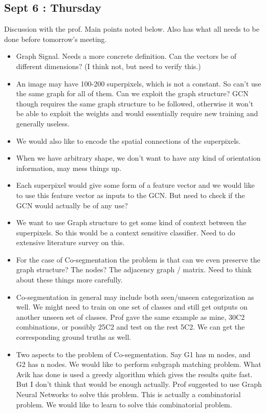 \documentclass{article}
\begin{document}
\subsection{Sept 6 : Thursday}
Discussion with the prof. Main points noted below. Also has what all needs to be done before tomorrow's meeting.
\begin{itemize}
\item Graph Signal. Needs a more concrete definition. Can the vectors be of different dimensions? (I think not, but need to verify this.)
\item An image may have 100-200 superpixels, which is not a constant. So can't use the same graph for all of them. Can we exploit the graph structure? GCN though requires the same graph structure to be followed, otherwise it won't be able to exploit the weights and would essentially require new training and generally useless.
\item We would also like to encode the spatial connections of the superpixels.
\item When we have arbitrary shape, we don't want to have any kind of orientation information, may mess things up.
\item Each superpixel would give some form of a feature vector and we would like to use this feature vector as inputs to the GCN. But need to check if the GCN would actually be of any use?
\item We want to use Graph structure to get some kind of context between the superpixels. So this would be a context sensitive classifier. Need to do extensive literature survey on this.
\item For the case of Co-segmentation the problem is that can we even preserve the graph structure? The nodes? The adjacency graph / matrix. Need to think about these things more carefully.
\item Co-segmentation in general may include both seen/unseen categorization as well. We might need to train on one set of classes and still get outputs on another unseen set of classes. Prof gave the same example as mine, 30C2 combinations, or possibly 25C2 and test on the rest 5C2. We can get the corresponding ground truths as well.
\item Two aspects to the problem of Co-segmentation. Say G1 has m nodes, and G2 has n nodes. We would like to perform subgraph matching problem. What Avik has done is used a greedy algorithm which gives the results quite fast. But I don't think that would be enough actually. Prof suggested to use Graph Neural Networks to solve this problem. This is actually a combinatorial problem. We would like to learn to solve this combinatorial problem.

\end{itemize}
\end{document}
